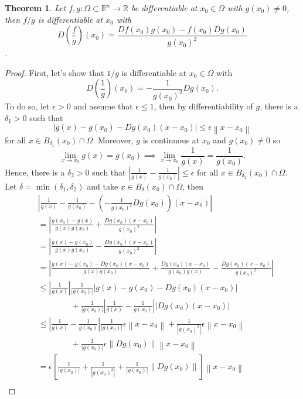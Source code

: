\documentclass{article}
\theoremstyle{plain}
\newtheorem{theorem}{Theorem}[subsection]
\theoremstyle{definition}
\newcommand{\R}{\mathbb{R}}
\newcommand{\norm}[1]{\left\lVert#1 \right\rVert}
\begin{document}
\begin{theorem}
    Let $f,g : \Omega \subset \R^n \to \R$ be differentiable at $x_0 \in \Omega$ with $g(x_0) \neq 0$, then $f/g$ is differentiable at $x_0$ with
    $$D\left(\frac{f}{g}\right)(x_0) = \frac{Df(x_0)g(x_0) - f(x_0)Dg(x_0)}{g(x_0)^2}$$.
\end{theorem}

\begin{proof}
    First, let's show that $1/g$ is differentiable at $x_0 \in \Omega$ with 
    $$D\left(\frac{1}{g}\right)(x_0) = -\frac{1}{g(x_0)^2}Dg(x_0).$$
    To do so, let $\epsilon > 0$ and assume that $\epsilon \leq 1$, then by differentiability of $g$, there is a $\delta_1 > 0$ such that
    $$|g(x) - g(x_0) - Dg(x_0)(x-x_0)| \leq \epsilon \norm{x - x_0}$$
    for all $x \in B_{\delta_1}(x_0) \cap \Omega$. Moreover, $g$ is continuous at $x_0$ and $g(x_0) \neq 0$ so
    $$\lim_{x \rightarrow x_0}g(x) = g(x_0) \implies \lim_{x \rightarrow x_0}\frac{1}{g(x)} = \frac{1}{g(x_0)}.$$
    Hence, there is a $\delta_2 > 0$ such that $|\frac{1}{g(x)} - \frac{1}{g(x_0)}| \leq \epsilon$ for all $x \in B_{\delta_2}(x_0) \cap \Omega$. Let $\delta = \min(\delta_1, \delta_2) $ and take $x \in B_{\delta}(x_0)\cap \Omega$, then
    \begin{align*}
        &\left|\frac{1}{g(x)} - \frac{1}{g(x_0)} - \left(-\frac{1}{g(x_0)^2}Dg(x_0)\right)(x - x_0)\right| \\
        &= \left|\frac{g(x_0) - g(x)}{g(x)g(x_0)} + \frac{Dg(x_0)(x - x_0)}{g(x_0)^2}\right| \\
        &= \left|\frac{g(x) - g(x_0)}{g(x)g(x_0)} - \frac{Dg(x_0)(x - x_0)}{g(x_0)^2}\right| \\
        &= \left|\frac{g(x) - g(x_0) - Dg(x_0)(x - x_0)}{g(x)g(x_0)} + \frac{Dg(x_0)(x - x_0)}{g(x_0)g(x)} - \frac{Dg(x_0)(x - x_0)}{g(x_0)^2}\right| \\
        &\leq \left|\frac{1}{g(x)}\right|\frac{1}{|g(x_0)|}|g(x) - g(x_0) - Dg(x_0)(x - x_0)| \\
        & \qquad \qquad + \frac{1}{|g(x_0)|} \left| \frac{1}{g(x)} - \frac{1}{g(x_0)}\right| |Dg(x_0)(x - x_0)| \\
        &\leq \left|\frac{1}{g(x)} - \frac{1}{g(x_0)}\right| \frac{1}{|g(x_0)|}\epsilon \norm{x - x_0} + \frac{1}{|g(x_0)^2|}\epsilon\norm{x - x_0} \\
        &\qquad \qquad + \frac{1}{|g(x_0)|}\epsilon \norm{Dg(x_0)} \norm{x - x_0} \\
        &= \epsilon\left[\frac{1}{|g(x_0)|} + \frac{1}{|g(x_0)^2|} + \frac{1}{|g(x_0)|}\norm{Dg(x_0)}\right]\norm{x - x_0} \\

\end{align*}
\end{proof}
\end{document}
